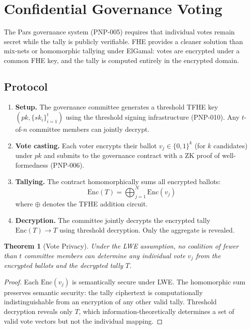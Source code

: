 \documentclass[11pt,a4paper]{article}
\newtheorem{theorem}{Theorem}[section]
\begin{document}
\section{Confidential Governance Voting}
\label{sec:voting}

The Pars governance system (PNP-005) requires that individual votes remain
secret while the tally is publicly verifiable.  FHE provides a cleaner
solution than mix-nets or homomorphic tallying under ElGamal: votes are
encrypted under a common FHE key, and the tally is computed entirely in
the encrypted domain.

\subsection{Protocol}

\begin{enumerate}
    \item \textbf{Setup.}  The governance committee generates a threshold
    TFHE key $(pk, \{sk_i\}_{i=1}^t)$ using the threshold signing
    infrastructure (PNP-010).  Any $t$-of-$n$ committee members can
    jointly decrypt.
    \item \textbf{Vote casting.}  Each voter encrypts their ballot
    $v_j \in \{0, 1\}^k$ (for $k$ candidates) under $pk$ and submits
    to the governance contract with a ZK proof of well-formedness
    (PNP-006).
    \item \textbf{Tallying.}  The contract homomorphically sums all
    encrypted ballots:
    \[
        \mathrm{Enc}(T) = \bigoplus_{j=1}^{N} \mathrm{Enc}(v_j)
    \]
    where $\oplus$ denotes the TFHE addition circuit.
    \item \textbf{Decryption.}  The committee jointly decrypts the
    encrypted tally $\mathrm{Enc}(T) \to T$ using threshold decryption.
    Only the aggregate is revealed.
\end{enumerate}

\begin{theorem}[Vote Privacy]
    Under the LWE assumption, no coalition of fewer than $t$ committee
    members can determine any individual vote $v_j$ from the encrypted
    ballots and the decrypted tally $T$.
\end{theorem}

\begin{proof}
    Each $\mathrm{Enc}(v_j)$ is semantically secure under LWE.  The
    homomorphic sum preserves semantic security: the tally ciphertext is
    computationally indistinguishable from an encryption of any other
    valid tally.  Threshold decryption reveals only $T$, which
    information-theoretically determines a set of valid vote vectors but
    not the individual mapping.
\end{proof}
\end{document}
